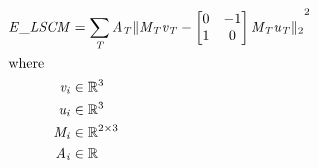 \documentclass[12pt]{article}
\begin{document}
\begin{center}
\resizebox{\textwidth}{!} 
{
\begin{minipage}[c]{\textwidth}
\begin{align*}
\mathit{E\_LSCM} & = \sum_\mathit{T} \mathit{A}_{ \mathit{T} }{\|\mathit{M}_{ \mathit{T} }\mathit{v}_{ \mathit{T} } - \begin{bmatrix}
0 & -1\\
1 & 0\\
\end{bmatrix}\mathit{M}_{ \mathit{T} }\mathit{u}_{ \mathit{T} }\|_2}^{2} \\
\intertext{where} 
\mathit{v}_{\mathit{i}} & \in \mathbb{R}^{ 3} \\
\mathit{u}_{\mathit{i}} & \in \mathbb{R}^{ 3} \\
\mathit{M}_{\mathit{i}} & \in \mathbb{R}^{ 2 \times 3 } \\
\mathit{A}_{\mathit{i}} & \in \mathbb{R} \\
\\
\end{align*}
\end{minipage}
}
\end{center}
\end{document}
